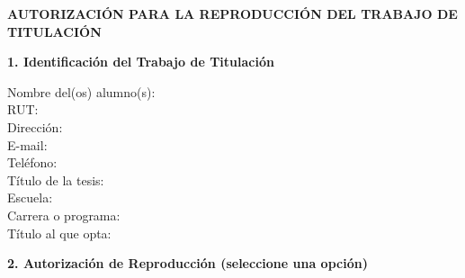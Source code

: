 
\clearpage
\thispagestyle{fancy}
\enlargethispage{4cm}


\begin{center}
    {\large\textbf{AUTORIZACIÓN PARA LA REPRODUCCIÓN DEL TRABAJO DE TITULACIÓN}}
\end{center}

\vspace{0.2cm}

\noindent\textbf{1. Identificación del Trabajo de Titulación}

\vspace{0.2cm}

\begin{singlespace}
\noindent
Nombre del(os) alumno(s): \dotfill\\[0.1cm]
RUT: \dotfill\\[0.1cm]
Dirección: \dotfill\\[0.1cm]
E-mail: \dotfill\\[0.1cm]
Teléfono: \dotfill\\[0.1cm]
Título de la tesis: \dotfill\\[0.1cm]
Escuela: \dotfill\\[0.1cm]
Carrera o programa: \dotfill\\[0.1cm]
Título al que opta: \dotfill
\end{singlespace}

\vspace{0.2cm}

\noindent\textbf{2. Autorización de Reproducción (seleccione una opción)}

\vspace{0.2cm}


